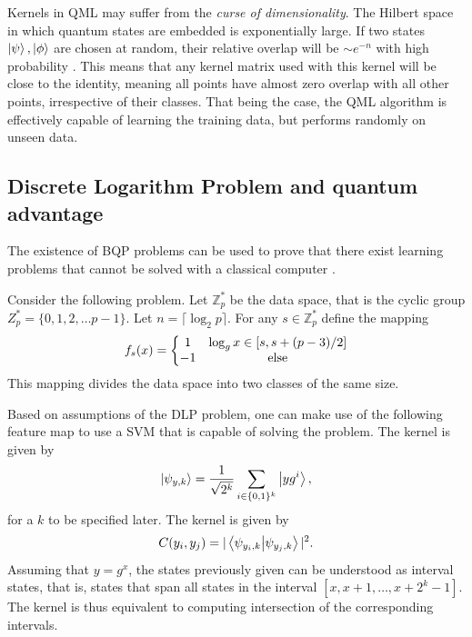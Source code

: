 \documentclass[]{report}
\begin{document}
Kernels in QML may suffer from the \textit{curse of dimensionality}. The Hilbert space in which quantum states are embedded is exponentially large. If two states $\ket\psi, \ket\phi$ are chosen at random, their relative overlap will be $\sim e^{-n}$ with high probability \cite{thanasilp2024exponential}. This means that any kernel matrix used with this kernel will be close to the identity, meaning all points have almost zero overlap with all other points, irrespective of their classes. That being the case, the QML algorithm is effectively capable of learning the training data, but performs randomly on unseen data.  

\subsection{Discrete Logarithm Problem and quantum advantage}\label{sec.dlp}

The existence of BQP problems can be used to prove that there exist learning problems that cannot be solved with a classical computer \cite{liu2021rigorous}. 

Consider the following problem. Let $\mathbb Z_p^*$ be the data space, that is the cyclic group $Z_p^* = \{0, 1,2,\ldots p-1 \}$. Let $n = \lceil  \log_2 p \rceil$. For any $s \in \mathbb Z_p^*$ define the mapping
\begin{equation}
f_s(x) = \left\{ 
\begin{matrix}
1 & \log_g x \in [s, s + (p - 3) / 2] \\
-1 & {\rm else}
\end{matrix}
\right.
\end{equation}
This mapping divides the data space into two classes of the same size. 

Based on assumptions of the DLP problem, one can make use of the following feature map to use a SVM that is capable of solving the problem. The kernel is given by
\begin{equation}
\ket{\psi_{y, k}} = \frac{1}{\sqrt{2^k}} \sum_{i \in \{ 0, 1\}^k } \ket{y g^{i}}, 
\end{equation}
for a $k$ to be specified later. The kernel is given by
\begin{equation}
C(y_i, y_j) = \vert \braket{\psi_{y_i, k}}{\psi_{y_j, k}}\vert^2.
\end{equation}
Assuming that $y = g^x$, the states previously given can be understood as interval states, that is, states that span all states in the interval $[x, x+1, \ldots, x + 2^k - 1]$. The kernel is thus equivalent to computing intersection of the corresponding intervals. 
\end{document}
